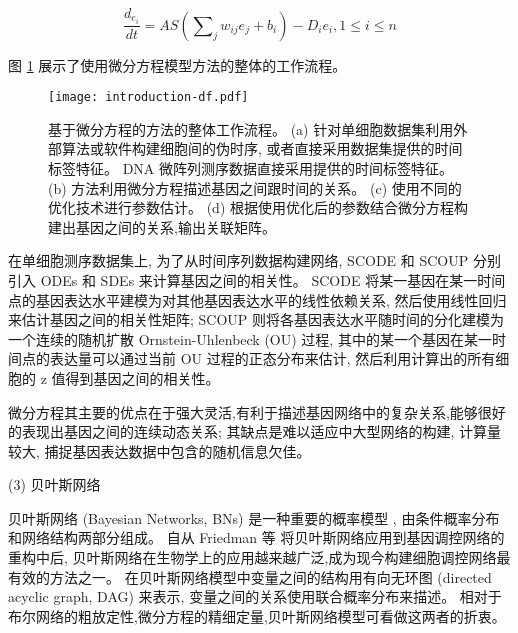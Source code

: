 \begin{equation}
\frac{{d_{e_i } }}{{dt}} = AS(\sum\nolimits_j {w_{ij} e_j } + b_i) - D_i e_i ,1 \le i \le n
\end{equation}

图 \ref{fig:pre-df} 展示了使用微分方程模型方法的整体的工作流程。
\begin{figure}[!htbp]
    \centering
    \texttt{[image: introduction-df.pdf]}
    \caption{
        基于微分方程的方法的整体工作流程。
        (a) 针对单细胞数据集利用外部算法或软件构建细胞间的伪时序, 或者直接采用数据集提供的时间标签特征。
         DNA 微阵列测序数据直接采用提供的时间标签特征。
        (b) 方法利用微分方程描述基因之间跟时间的关系。
        (c) 使用不同的优化技术进行参数估计。
        (d) 根据使用优化后的参数结合微分方程构建出基因之间的关系,输出关联矩阵。
    }
    \label{fig:pre-df}
\end{figure}

在单细胞测序数据集上, 
为了从时间序列数据构建网络, SCODE \cite{matsumoto2017scode} 和 SCOUP \cite{matsumoto2016scoup} 
分别引入 ODEs 和 SDEs 来计算基因之间的相关性。
SCODE 将某一基因在某一时间点的基因表达水平建模为对其他基因表达水平的线性依赖关系,
然后使用线性回归来估计基因之间的相关性矩阵;
SCOUP 则将各基因表达水平随时间的分化建模为一个连续的随机扩散 Ornstein-Uhlenbeck (OU) 过程,
其中的某一个基因在某一时间点的表达量可以通过当前 OU 过程的正态分布来估计,
然后利用计算出的所有细胞的 z 值得到基因之间的相关性。

微分方程其主要的优点在于强大灵活,有利于描述基因网络中的复杂关系,能够很好的表现出基因之间的连续动态关系;
其缺点是难以适应中大型网络的构建, 计算量较大, 捕捉基因表达数据中包含的随机信息欠佳。

(3) 贝叶斯网络

贝叶斯网络 (Bayesian Networks, BNs) 是一种重要的概率模型 \cite{kim2003inferring,zou2004new,chen2006effective,needham2007primer,lo2015high},
由条件概率分布和网络结构两部分组成。
自从 Friedman 等 \cite{friedman2000using} 将贝叶斯网络应用到基因调控网络的重构中后,
贝叶斯网络在生物学上的应用越来越广泛,成为现今构建细胞调控网络最有效的方法之一。
在贝叶斯网络模型中变量之间的结构用有向无环图 (directed acyclic graph, DAG) 来表示,
变量之间的关系使用联合概率分布来描述。
相对于布尔网络的粗放定性,微分方程的精细定量,贝叶斯网络模型可看做这两者的折衷。

